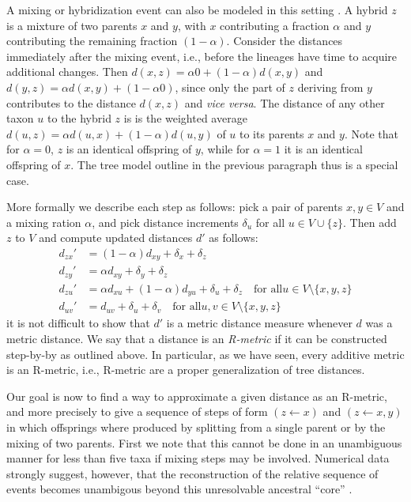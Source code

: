 \documentclass[amsmath]{lni}
\begin{document}
A mixing or hybridization event can also be modeled in this setting
\cite{Prohaska:18a}. A hybrid $z$ is a mixture of two parents $x$ and $y$,
with $x$ contributing a fraction $\alpha$ and $y$ contributing the
remaining fraction $(1-\alpha)$. Consider the distances immediately after
the mixing event, i.e., before the lineages have time to acquire additional
changes. Then $d(x,z)=\alpha 0 + (1-\alpha) d(x,y)$ and
$d(y,z) = \alpha d(x,y) + (1-\alpha 0)$, since only the part of $z$
deriving from $y$ contributes to the distance $d(x,z)$ and \textit{vice
  versa}. The distance of any other taxon $u$ to the hybrid $z$ is is the
weighted average $d(u,z)=\alpha d(u,x)+(1-\alpha) d(u,y)$ of $u$ to its
parents $x$ and $y$. Note that for $\alpha=0$, $z$ is an identical
offspring of $y$, while for $\alpha=1$ it is an identical offspring of
$x$. The tree model outline in the previous paragraph thus is a special
case.

More formally we describe each step as follows: pick a pair of parents
$x,y\in V$ and a mixing ration $\alpha$, and pick distance
increments $\delta_u$ for all $u\in V\cup\{z\}$. Then add $z$ to $V$
and compute updated distances $d'$ as follows: 
\begin{equation} 
\begin{split} 
  d_{zx}' & = (1-\alpha)  d_{xy} +\delta_x + \delta_z \\
  d_{zy}' & =   \alpha    d_{xy} +\delta_y + \delta_z  \\
  d_{zu}' & =   \alpha    d_{xu} + (1-\alpha)  d_{yu} + \delta_u + \delta_z
  \quad\textrm{for all}  u\in V\setminus\{ x,y,z \}\\
  d_{uv}' & = d_{uv}+\delta_u+\delta_v
  \quad\textrm{for all}  u,v\in V\setminus\{ x,y,z \}
\end{split}
\label{eq:forward}
\end{equation}
it is not difficult to show that $d'$ is a metric distance measure whenever
$d$ was a metric distance. We say that a distance is an \emph{R-metric} if
it can be constructed step-by-by as outlined above. In particular, as we
have seen, every additive metric is an R-metric, i.e., R-metric are a
proper generalization of tree distances. 

Our goal is now to find a way to approximate a given distance as an
R-metric, and more precisely to give a sequence of steps of form
$(z\leftarrow x)$ and $(z\leftarrow x,y)$ in which offsprings where
produced by splitting from a single parent or by the mixing of two
parents. First we note that this cannot be done in an unambiguous manner
for less than five taxa if mixing steps may be involved. Numerical data
strongly suggest, however, that the reconstruction of the relative sequence
of events becomes unambigous beyond this unresolvable ancestral ``core''
\cite{Prohaska:18a}. 
\end{document}
